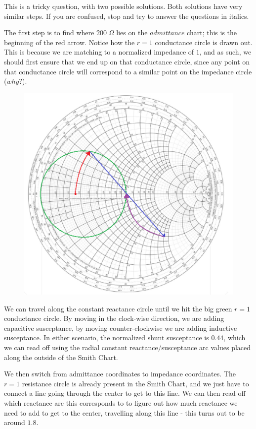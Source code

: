 \documentclass{article}
\begin{document}
This is a tricky question, with two possible solutions. Both solutions have very similar steps. If you are confused, stop and try to answer the questions in italics.

\vspace{3mm}

The first step is to find where $200 \;\Omega$ lies on the $admittance$ chart; this is the beginning of the red arrow. Notice how the $r=1$ conductance circle is drawn out. This is because we are matching to a normalized impedance of $1$, and as such, we should first ensure that we end up on that conductance circle, since any point on that conductance circle will correspond to a similar point on the impedance circle ($why?$). 

\begin{figure}[ht!]
\begin{center}
    \includegraphics[width=0.7\linewidth]{figures/smith.png}
\end{center}
\end{figure}

We can travel along the constant reactance circle until we hit the big green $r = 1$ conductance circle. By moving in the clock-wise direction, we are adding capacitive susceptance, by moving counter-clockwise we are adding inductive susceptance. In either scenario, the normalized shunt susceptance is $0.44$, which we can read off using the radial constant reactance/susceptance arc values placed along the outside of the Smith Chart.

\newpage

We then switch from admittance coordinates to impedance coordinates. The $r = 1$ resistance circle is already present in the Smith Chart, and we just have to connect a line going through the center to get to this line. We can then read off which reactance arc this corresponds to to figure out how much reactance we need to add to get to the center, travelling along this line - this turns out to be around $1.8$. 
\end{document}
